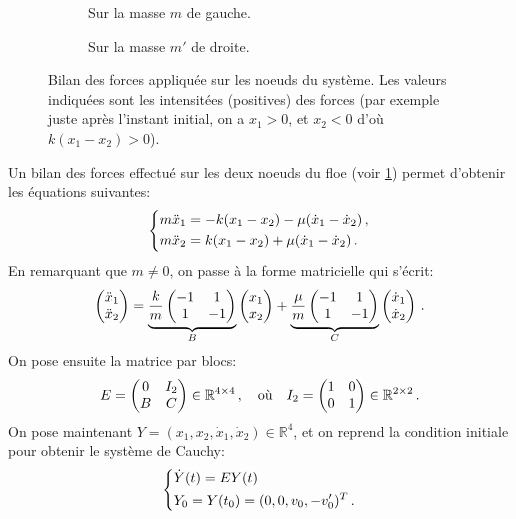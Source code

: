 \begin{figure}[!h]
    \begin{subfigure}[b]{0.33\textwidth}
        \centering
        \caption{Sur la masse $m$ de gauche.}
    \end{subfigure}
    \begin{subfigure}[b]{0.3\textwidth}
        \centering
        \caption{Sur la masse $m'$ de droite.}
    \end{subfigure}
       \caption{Bilan des forces appliquée sur les noeuds du système. Les valeurs indiquées sont les intensitées (positives) des forces (par exemple juste après l'instant initial, on a $x_1 > 0$, et $x_2 < 0$ d'où $k(x_1-x_2) > 0$).}
       \label{fig:bilan0}
\end{figure}


\noindent Un bilan des forces effectué sur les deux noeuds du floe (voir \cref{fig:bilan0}) permet d'obtenir les équations suivantes:
\begin{align}
    \begin{dcases}
    m\ddot x_1 = - k(x_1 - x_2) - \mu(\dot x_1 - \dot x_2) \,,\\
        m \ddot x_2 =  k(x_1 - x_2) + \mu(\dot x_1 - \dot x_2) \,. 
    \end{dcases}
\end{align}
En remarquant que $m\neq 0$, on passe à la forme matricielle qui s'écrit:
\begin{align}
    \begin{pmatrix} \ddot{x}_1 \\ \ddot{x}_2 \end{pmatrix} = 
      \underbrace{ \frac{k}{m} \begin{pmatrix} -1 & 1 \\ 1 & -1 \end{pmatrix}}_{B} \begin{pmatrix} x_1 \\ x_2 \end{pmatrix}
    + \underbrace{\frac{\mu}{m} \begin{pmatrix} -1 & 1 \\ 1 & -1 \end{pmatrix}}_{C} \begin{pmatrix} \dot{x}_1 \\ \dot{x}_2 \end{pmatrix} \,.
\end{align}
On pose ensuite la matrice par blocs:
\[ E = \begin{pmatrix} 0 & I_2 \\ B & C \end{pmatrix} \in \mathbb{R}^{4\times 4} \,, \quad \text{où} \quad I_2 = \begin{pmatrix} 1 & 0 \\ 0 & 1 \end{pmatrix} \in \mathbb{R}^{2\times 2} \,. \]
On pose maintenant $Y = (x_1, x_2, \dot{x}_1, \dot{x}_2) \in \mathbb{R}^4$, et on reprend la condition initiale pour obtenir le système de Cauchy:
\begin{align} \label{eq:dep1d}
    \begin{dcases}
        \dot{Y}(t)= E Y(t) \\
        Y_0 = Y(t_0) = (0,0,v_0,-v'_0)^T \,.
    \end{dcases}
\end{align}

